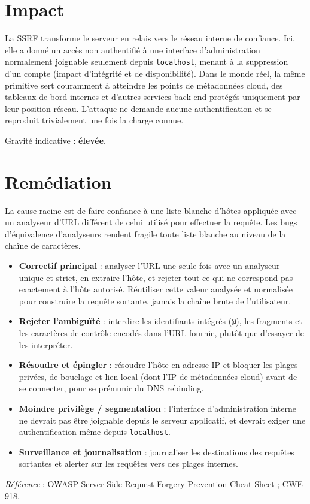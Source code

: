 \documentclass[11pt,a4paper]{article}
\begin{document}
\section{Impact}
La SSRF transforme le serveur en relais vers le réseau interne de confiance.
Ici, elle a donné un accès non authentifié à une interface d'administration
normalement joignable seulement depuis \texttt{localhost}, menant à la
suppression d'un compte (impact d'intégrité et de disponibilité). Dans le monde
réel, la même primitive sert couramment à atteindre les points de métadonnées
cloud, des tableaux de bord internes et d'autres services back-end protégés
uniquement par leur position réseau. L'attaque ne demande aucune
authentification et se reproduit trivialement une fois la charge connue.

Gravité indicative : \textbf{élevée}.

\section{Remédiation}
La cause racine est de faire confiance à une liste blanche d'hôtes appliquée
avec un analyseur d'URL différent de celui utilisé pour effectuer la requête.
Les bugs d'équivalence d'analyseurs rendent fragile toute liste blanche au
niveau de la chaîne de caractères.

\begin{itemize}
  \item \textbf{Correctif principal} : analyser l'URL une seule fois avec un analyseur unique et strict, en extraire l'hôte, et rejeter tout ce qui ne correspond pas exactement à l'hôte autorisé. Réutiliser cette valeur analysée et normalisée pour construire la requête sortante, jamais la chaîne brute de l'utilisateur.
  \item \textbf{Rejeter l'ambiguïté} : interdire les identifiants intégrés (\texttt{@}), les fragments et les caractères de contrôle encodés dans l'URL fournie, plutôt que d'essayer de les interpréter.
  \item \textbf{Résoudre et épingler} : résoudre l'hôte en adresse IP et bloquer les plages privées, de bouclage et lien-local (dont l'IP de métadonnées cloud) avant de se connecter, pour se prémunir du DNS rebinding.
  \item \textbf{Moindre privilège / segmentation} : l'interface d'administration interne ne devrait pas être joignable depuis le serveur applicatif, et devrait exiger une authentification même depuis \texttt{localhost}.
  \item \textbf{Surveillance et journalisation} : journaliser les destinations des requêtes sortantes et alerter sur les requêtes vers des plages internes.
\end{itemize}

\vspace{4pt}
\noindent\emph{Référence} : OWASP Server-Side Request Forgery Prevention Cheat
Sheet ; CWE-918.
\end{document}
